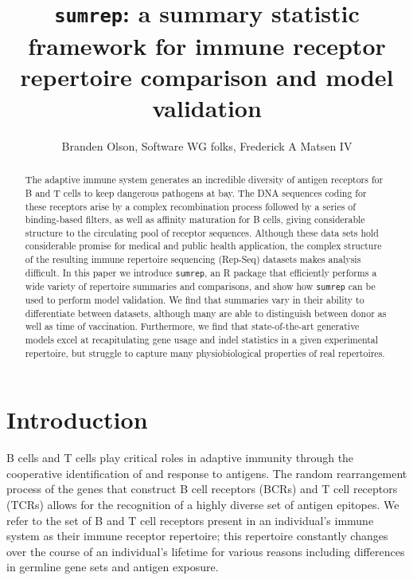 \documentclass{article}
\title{\texttt{sumrep}: a summary statistic framework for immune receptor repertoire comparison and model validation}
\author{Branden Olson, Software WG folks, Frederick A Matsen IV}
\newcommand{\partis}{\texttt{partis}}
\newcommand{\igor}{\texttt{IGoR}}
\newcommand{\igblast}{\text{IgBlast}}
\begin{document}

\maketitle

\begin{abstract}
The adaptive immune system generates an incredible diversity of antigen receptors for B and T cells to keep dangerous pathogens at bay.
The DNA sequences coding for these receptors arise by a complex recombination process followed by a series of binding-based filters, as well as affinity maturation for B cells, giving considerable structure to the circulating pool of receptor sequences.
Although these data sets hold considerable promise for medical and public health application, the complex structure of the resulting immune repertoire sequencing (Rep-Seq) datasets makes analysis difficult.
In this paper we introduce \texttt{sumrep}, an R package that efficiently performs a wide variety of repertoire summaries and comparisons, and show how \texttt{sumrep} can be used to perform model validation.
We find that summaries vary in their ability to differentiate between datasets, although many are able to distinguish between donor as well as time of vaccination.
Furthermore, we find that state-of-the-art generative models excel at recapitulating gene usage and indel statistics in a given experimental repertoire, but struggle to capture many physiobiological properties of real repertoires.
\end{abstract}


\section*{Introduction}

B cells and T cells play critical roles in adaptive immunity through the cooperative identification of and response to antigens.
The random rearrangement process of the genes that construct B cell receptors (BCRs) and T cell receptors (TCRs) allows for the recognition of a highly diverse set of antigen epitopes.
We refer to the set of B and T cell receptors present in an individual's immune system as their immune receptor repertoire; this repertoire constantly changes over the course of an individual's lifetime for various reasons including differences in germline gene sets and antigen exposure.
\end{document}
